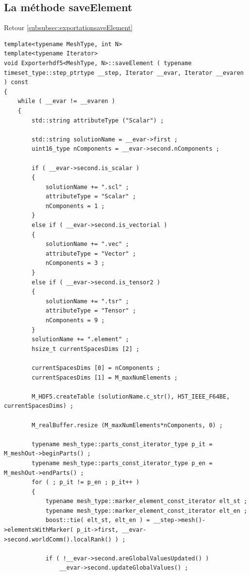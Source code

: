 \documentclass[12pt]{article}
\begin{document}
\subsection {La méthode saveElement}
\label{subsec:saveElement}
Retour \ref{subsubsec:exportationsaveElement}
\begin{lstlisting}
template<typename MeshType, int N>
template<typename Iterator>
void Exporterhdf5<MeshType, N>::saveElement ( typename timeset_type::step_ptrtype __step, Iterator __evar, Iterator __evaren ) const 
{
    while ( __evar != __evaren ) 
    {
        std::string attributeType ("Scalar") ;

        std::string solutionName = __evar->first ;
        uint16_type nComponents = __evar->second.nComponents ;

        if ( __evar->second.is_scalar )
        {
            solutionName += ".scl" ; 
            attributeType = "Scalar" ;
            nComponents = 1 ;
        }
        else if ( __evar->second.is_vectorial )
        {
            solutionName += ".vec" ;
            attributeType = "Vector" ;
            nComponents = 3 ;
        }
        else if ( __evar->second.is_tensor2 )
        {
            solutionName += ".tsr" ;
            attributeType = "Tensor" ;
            nComponents = 9 ;
        }
        solutionName += ".element" ;
        hsize_t currentSpacesDims [2] ;

        currentSpacesDims [0] = nComponents ;
        currentSpacesDims [1] = M_maxNumElements ;

        M_HDF5.createTable (solutionName.c_str(), H5T_IEEE_F64BE, currentSpacesDims) ;

        M_realBuffer.resize (M_maxNumElements*nComponents, 0) ;

        typename mesh_type::parts_const_iterator_type p_it = M_meshOut->beginParts() ;
        typename mesh_type::parts_const_iterator_type p_en = M_meshOut->endParts() ;
        for ( ; p_it != p_en ; p_it++ ) 
        {
            typename mesh_type::marker_element_const_iterator elt_st ;
            typename mesh_type::marker_element_const_iterator elt_en ;
            boost::tie( elt_st, elt_en ) = __step->mesh()->elementsWithMarker( p_it->first, __evar->second.worldComm().localRank() ) ;

            if ( !__evar->second.areGlobalValuesUpdated() )
                __evar->second.updateGlobalValues() ;


\end{lstlisting}
\end{document}

